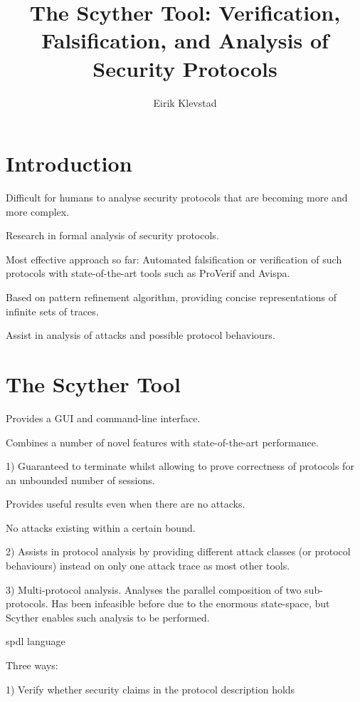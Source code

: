 \documentclass[10pt]{article}
\begin{document}
\author{Eirik Klevstad}
\title{The Scyther Tool: Verification, Falsification, and Analysis of Security Protocols}
\maketitle

\section{Introduction}

Difficult for humans to analyse security protocols that are becoming more and more complex.

Research in formal analysis of security protocols.

Most effective approach so far: Automated falsification or verification of such protocols with state-of-the-art tools such as ProVerif and Avispa.

Based on pattern refinement algorithm, providing concise representations of infinite sets of traces.

Assist in analysis of attacks and possible protocol behaviours.


\section{The Scyther Tool}

Provides a GUI and command-line interface.

Combines a number of novel features with state-of-the-art performance.

1) Guaranteed to terminate whilst allowing to prove correctness of protocols for an unbounded number of sessions.

Provides useful results even when there are no attacks.

No attacks existing within a certain bound. 


2) Assists in protocol analysis by providing different attack classes (or protocol behaviours) instead on only one attack trace as most other tools.

3) Multi-protocol analysis. Analyses the parallel composition of two sub-protocols. Has been infeasible before due to the enormous state-space, but Scyther enables such analysis to be performed.

spdl language

Three ways:

1) Verify whether security claims in the protocol description holds
\end{document}
